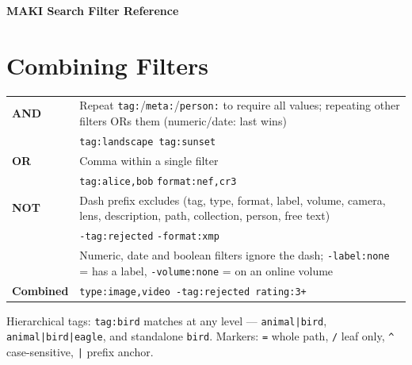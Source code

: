 \documentclass[a4paper,10pt]{extarticle}
\newcommand{\cmd}[1]{\texttt{#1}}
\begin{document}
\newpage


\begin{center}
{\Large\bfseries\color{maki-salmon} MAKI Search Filter Reference}
\end{center}
\vspace{4pt}

\begin{minipage}[t]{0.47\textwidth}

\vspace{0pt}%
\section{Combining Filters}

\renewcommand{\arraystretch}{1.4}
\begin{tabularx}{\textwidth}{@{}l X@{}}
\textbf{AND} & Repeat \cmd{tag:}/\cmd{meta:}/\cmd{person:} to require all values; repeating other filters ORs them (numeric/date: last wins) \\
             & \cmd{tag:landscape tag:sunset} \\[6pt]
\textbf{OR}  & Comma within a single filter \\
             & \cmd{tag:alice,bob} \quad \cmd{format:nef,cr3} \\[6pt]
\textbf{NOT} & Dash prefix excludes (tag, type, format, label, volume, camera, lens, description, path, collection, person, free text) \\
             & \cmd{-tag:rejected} \quad \cmd{-format:xmp} \\
             & {\small Numeric, date and boolean filters ignore the dash; \cmd{-label:none} = has a label, \cmd{-volume:none} = on an online volume} \\[6pt]
\textbf{Combined} & \cmd{type:image,video -tag:rejected rating:3+} \\
\end{tabularx}

\vspace{4pt}
Hierarchical tags: \cmd{tag:bird} matches at any level --- \cmd{animal|bird}, \cmd{animal|bird|eagle}, and standalone \cmd{bird}. Markers: \cmd{=} whole path, \cmd{/} leaf only, \cmd{\textasciicircum} case-sensitive, \cmd{|} prefix anchor.

\vspace{18pt}

\end{minipage}
\end{document}
